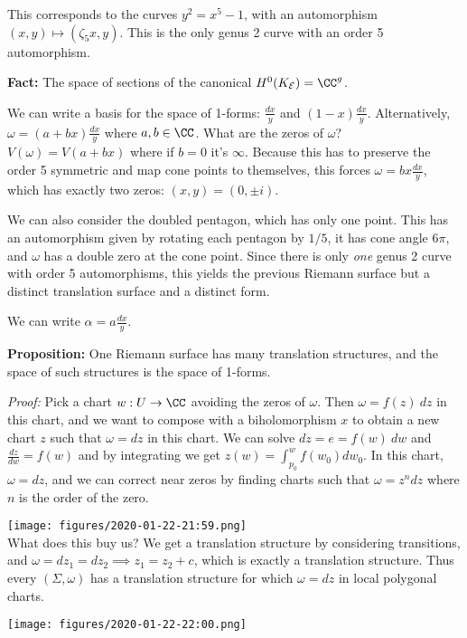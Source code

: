 This corresponds to the curves \(y^2 = x^5 - 1\), with an automorphism
\((x, y) \mapsto (\zeta_5 x, y)\). This is the only genus 2 curve with
an order 5 automorphism.

\textbf{Fact:} The space of sections of the canonical
\(H^0(K_{\mathcal E}) = \CC^g\).

We can write a basis for the space of 1-forms: \(\frac{dx}{y}\) and
\((1-x) \frac{dx}{y}\). Alternatively, \(\omega = (a+bx) \frac{dx}{y}\)
where \(a, b \in \CC\). What are the zeros of \(\omega\)?
\(V(\omega) = V(a + bx)\) where if \(b=0\) it's \(\infty\). Because this
has to preserve the order 5 symmetric and map cone points to themselves,
this forces \(\omega = bx \frac{dx}{y}\), which has exactly two zeros:
\((x, y) = (0, \pm i)\).

We can also consider the doubled pentagon, which has only one point.
This has an automorphism given by rotating each pentagon by \(1/5\), it
has cone angle \(6\pi\), and \(\omega\) has a double zero at the cone
point. Since there is only \emph{one} genus 2 curve with order 5
automorphisms, this yields the previous Riemann surface but a distinct
translation surface and a distinct form.

We can write \(\alpha = a \frac{dx}{y}\).

\textbf{Proposition:} One Riemann surface has many translation
structures, and the space of such structures is the space of 1-forms.

\emph{Proof:} Pick a chart \(w: U \to \CC\) avoiding the zeros of
\(\omega\). Then \(\omega = f(z) ~dz\) in this chart, and we want to
compose with a biholomorphism \(x\) to obtain a new chart \(z\) such
that \(\omega = dz\) in this chart. We can solve \(dz = e = f(w) ~dw\)
and \(\frac{dz}{dw} = f(w)\) and by integrating we get
\(z(w) = \int_{p_0}^w f(w_0) dw_0\). In this chart, \(\omega = dz\), and
we can correct near zeros by finding charts such that
\(\omega = z^n dz\) where \(n\) is the order of the zero.

\texttt{[image: figures/2020-01-22-21:59.png]}\\

What does this buy us? We get a translation structure by considering
transitions, and \(\omega = dz_1 = dz_2 \implies z_1 = z_2 + c\), which
is exactly a translation structure. Thus every \((\Sigma, \omega)\) has
a translation structure for which \(\omega = dz\) in local polygonal
charts.

\texttt{[image: figures/2020-01-22-22:00.png]}\\

